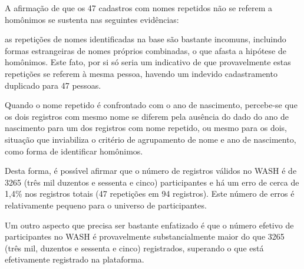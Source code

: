 \documentclass[
12pt,		%
openright,	%
twoside,  %
a4paper,			%
chapter=TITLE,		%
english,			%
french,				%
spanish,			%
brazil				%
]{USPSC-classe/USPSC}
\begin{document}
A afirma\c{c}\~ao de que os 47 cadastros com nomes repetidos n\~ao se referem a hom\^onimos se sustenta nas seguintes evid\^encias:















\begin{alineas}
\item as repeti\c{c}\~oes de nomes identificadas na base s\~ao bastante incomuns, incluindo formas estrangeiras de nomes pr\'oprios combinadas, o que afasta a hip\'otese de hom\^onimos. Este fato, por si s\'o seria um indicativo de que provavelmente estas repeti\c{c}\~oes se referem \`a mesma pessoa, havendo um indevido cadastramento duplicado para 47 pessoas.
\item Quando o nome repetido \'e confrontado com o ano de nascimento, percebe-se que os dois registros com mesmo nome se diferem pela aus\^encia do dado do ano de nascimento para um dos registros com nome repetido, ou mesmo para os dois, situa\c{c}\~ao que inviabiliza o crit\'erio de agrupamento de nome e ano de nascimento, como forma de identificar hom\^onimos.
\end{alineas}

Desta forma, \'e poss\'{\i}vel afirmar que o n\'umero de registros v\'alidos no WASH \'e de 3265 (tr\^es mil duzentos e sessenta e cinco) participantes e h\'a um erro de cerca de 1,4\% nos registros totais (47 repeti\c{c}\~oes em 94 registros). Este n\'umero de erros \'e relativamente pequeno para o universo de participantes.














Um outro aspecto que precisa ser bastante enfatizado \'e que o n\'umero efetivo de participantes no WASH \'e provavelmente substancialmente maior do que 3265 (tr\^es mil, duzentos e sessenta e cinco) registrados, superando o que est\'a efetivamente registrado na plataforma.
\end{document}
